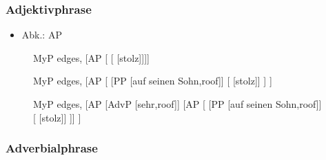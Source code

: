 \begin{frame}
\frametitle{Adjektivphrase}

\begin{itemize}
	\item Abk.: AP
\end{itemize}

\begin{figure}[b]
	\begin{minipage}[b]{0.18\textwidth}
	\centering
	\footnotesize{
		\begin{forest}
		MyP edges,
		[AP [ [ [stolz]]]]
		\end{forest}
		}
  	\end{minipage}  
  	\pause            
	\begin{minipage}[b]{0.03\textwidth}
	\hfill
  	\end{minipage}
  	\begin{minipage}[b]{0.30\textwidth}
	\centering
	\footnotesize{
		\begin{forest}
		MyP edges,
		[AP [	[PP [auf seinen Sohn,roof]]
						[\zerobar{A} [stolz]]
			]
		]			 
		\end{forest}
		}
  	\end{minipage}  
	\begin{minipage}[b]{0.03\textwidth}
	\hfill
  	\end{minipage}
  	\pause            
	\begin{minipage}[b]{0.41\textwidth}
	\centering
	\footnotesize{
		\begin{forest}
		MyP edges,
		[AP [AdvP [sehr,roof]]
			[AP 
		    [	[PP [auf seinen Sohn,roof]]				
		    			[ [stolz]]
			]]
		]			 
		\end{forest}
		}
  	\end{minipage}
\end{figure}
\end{frame}


\subsubsection{Adverbialphrase}

